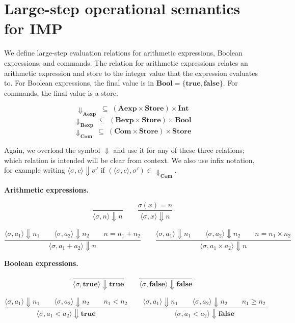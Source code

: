 \section{Large-step operational semantics for IMP}

We define large-step evaluation relations for arithmetic expressions, Boolean expressions, and
commands. The relation for arithmetic expressions relates an arithmetic expression and store to
the integer value that the expression evaluates to. For Boolean expressions, the final value is
in $\mathbf{Bool} = \{\mathbf{true}, \mathbf{false}\}$. For commands, the final value is a
store.

\[
\Downarrow_{\mathbf{Aexp}} \; \subseteq \; (\mathbf{Aexp} \times \mathbf{Store}) \times
\mathbf{Int}
\]
\[
\Downarrow_{\mathbf{Bexp}} \; \subseteq \; (\mathbf{Bexp} \times \mathbf{Store}) \times
\mathbf{Bool}
\]
\[
\Downarrow_{\mathbf{Com}} \; \subseteq \; (\mathbf{Com} \times \mathbf{Store}) \times
\mathbf{Store}
\]

Again, we overload the symbol $\Downarrow$ and use it for any of these three relations; which
relation is intended will be clear from context. We also use infix notation, for example
writing $\langle \sigma, c \rangle \Downarrow \sigma'$ if $(\langle \sigma, c \rangle, \sigma')
\in {\Downarrow_{\mathbf{Com}}}$.


\medskip
\noindent\textbf{Arithmetic expressions.}

\[
\frac{}{\langle \sigma, n \rangle \Downarrow n}
\qquad
\frac{\sigma(x) = n}{\langle \sigma, x \rangle \Downarrow n}
\]

\[
\frac{\langle \sigma, a_1 \rangle \Downarrow n_1 \qquad \langle \sigma, a_2 \rangle \Downarrow
n_2 \qquad n = n_1 + n_2}{\langle \sigma, a_1 + a_2 \rangle \Downarrow n}
\qquad
\frac{\langle \sigma, a_1 \rangle \Downarrow n_1 \qquad \langle \sigma, a_2 \rangle \Downarrow
n_2 \qquad n = n_1 \times n_2}{\langle \sigma, a_1 \times a_2 \rangle \Downarrow n}
\]

\medskip
\noindent\textbf{Boolean expressions.}

\[
\frac{}{\langle \sigma, \mathbf{true} \rangle \Downarrow \mathbf{true}}
\qquad
\frac{}{\langle \sigma, \mathbf{false} \rangle \Downarrow \mathbf{false}}
\]

\[
\frac{\langle \sigma, a_1 \rangle \Downarrow n_1 \qquad \langle \sigma, a_2 \rangle \Downarrow
n_2 \qquad n_1 < n_2}{\langle \sigma, a_1 < a_2 \rangle \Downarrow \mathbf{true}}
\qquad
\frac{\langle \sigma, a_1 \rangle \Downarrow n_1 \qquad \langle \sigma, a_2 \rangle \Downarrow
n_2 \qquad n_1 \geq n_2}{\langle \sigma, a_1 < a_2 \rangle \Downarrow \mathbf{false}}
\]

